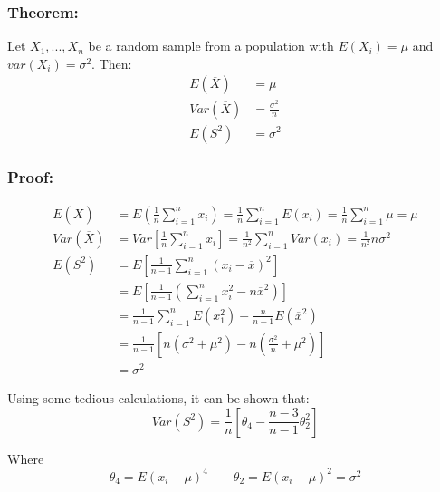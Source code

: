 \documentclass{article}
\begin{document}
\subsubsection*{Theorem:}

Let $X_1,...,X_n$ be a random sample from a population with $E(X_i) = \mu$ and $var(X_i) = \sigma^2$. Then:
\begin{equation*}
    \begin{split}
        E(\overline{X}) &= \mu\\
        Var(\overline{X}) &= \frac{\sigma^2}{n}\\
        E(S^2) &= \sigma^2
    \end{split}
\end{equation*}

\subsubsection*{Proof:}
\begin{equation*}
    \begin{split}
        E(\overline{X}) &= E\left( \frac{1}{n}\sum_{i=1}^n x_i \right) = \frac{1}{n}\sum_{i=1}^n E(x_i ) = \frac{1}{n}\sum_{i=1}^n \mu = \mu\\
        Var(\overline{X}) &= Var\left[\frac{1}{n} \sum_{i=1}^n x_i \right] = \frac{1}{n^2} \sum_{i=1}^n Var(x_i) = \frac{1}{n^2}n\sigma^2 \\
        E(S^2) &= E\left[\frac{1}{n-1}\sum_{i=1}^n (x_i - \overline{x})^2 \right]\\
        &= E \left[\frac{1}{n-1} \left(\sum_{i=1}^n x_i^2 - n \overline{x}^2 \right) \right]\\
        &= \frac{1}{n-1}\sum_{i=1}^n E(x_1^2) - \frac{n}{n-1} E(\overline{x}^2)\\
        &= \frac{1}{n-1}\left[n(\sigma^2 + \mu^2) - n\left(\frac{\sigma^2}{n} + \mu^2 \right) \right]\\
        &= \sigma^2
    \end{split}
\end{equation*}

Using some tedious calculations, it can be shown that:
\begin{equation*}
    Var(S^2) = \frac{1}{n}\left[\theta_4 - \frac{n-3}{n-1} \theta_2^2 \right]
\end{equation*}

Where
\begin{equation*}
    \theta_4 = E(x_i-\mu)^4 \quad \quad \theta_2 = E(x_i - \mu)^2 = \sigma^2
\end{equation*}
\\~\\
\end{document}
